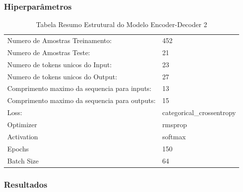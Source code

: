 \subsubsection{Hiperparâmetros} 

\begin{table}[H]
\centering
\begin{tabular}{ll}
Numero de Amostras Treinamento: & 452 \\
Numero de Amostras Teste: & 21 \\
Numero de tokens unicos do Input: & 23 \\
Numero de tokens unicos do Output: & 27 \\
Comprimento maximo da sequencia para inputs: & 13 \\
Comprimento maximo da sequencia para outputs: & 15 \\
Loss: & categorical\_crossentropy \\
Optimizer & rmsprop \\
Activation & softmax \\
Epochs & 150 \\
Batch Size & 64
\end{tabular}
\caption{Tabela Resumo Estrutural do Modelo Encoder-Decoder 2}
\label{tab:resumo21}
\end{table}

\subsubsection{Resultados}

